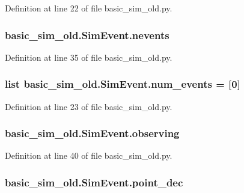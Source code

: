 Definition at line 22 of file basic\-\_\-sim\-\_\-old.\-py.

\hypertarget{classbasic__sim__old_1_1_sim_event_a34b942af37c343a76ffb11ec96507ee4}{
\subsubsection[{nevents}]{\setlength{\rightskip}{0pt plus 5cm}basic\-\_\-sim\-\_\-old.\-Sim\-Event.\-nevents}}\label{classbasic__sim__old_1_1_sim_event_a34b942af37c343a76ffb11ec96507ee4}


Definition at line 35 of file basic\-\_\-sim\-\_\-old.\-py.

\hypertarget{classbasic__sim__old_1_1_sim_event_a7e7f42822946c5534013986c75c7e6fb}{
\subsubsection[{num\-\_\-events}]{\setlength{\rightskip}{0pt plus 5cm}list basic\-\_\-sim\-\_\-old.\-Sim\-Event.\-num\-\_\-events = \mbox{[}0\mbox{]}\hspace{0.3cm}{\ttfamily [static]}}}\label{classbasic__sim__old_1_1_sim_event_a7e7f42822946c5534013986c75c7e6fb}


Definition at line 23 of file basic\-\_\-sim\-\_\-old.\-py.

\hypertarget{classbasic__sim__old_1_1_sim_event_a6884bb4ef3a110c576b844ba4c55a2de}{
\subsubsection[{observing}]{\setlength{\rightskip}{0pt plus 5cm}basic\-\_\-sim\-\_\-old.\-Sim\-Event.\-observing}}\label{classbasic__sim__old_1_1_sim_event_a6884bb4ef3a110c576b844ba4c55a2de}


Definition at line 40 of file basic\-\_\-sim\-\_\-old.\-py.

\hypertarget{classbasic__sim__old_1_1_sim_event_a208e8a3ab9415076107943511f7540d5}{
\subsubsection[{point\-\_\-dec}]{\setlength{\rightskip}{0pt plus 5cm}basic\-\_\-sim\-\_\-old.\-Sim\-Event.\-point\-\_\-dec}}\label{classbasic__sim__old_1_1_sim_event_a208e8a3ab9415076107943511f7540d5}


